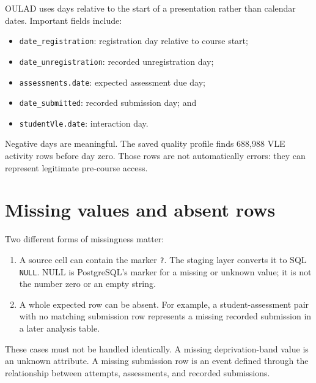 OULAD uses days relative to the start of a presentation rather than calendar
dates. Important fields include:
\begin{itemize}
  \item \texttt{date\_registration}: registration day relative to course start;
  \item \texttt{date\_unregistration}: recorded unregistration day;
  \item \texttt{assessments.date}: expected assessment due day;
  \item \texttt{date\_submitted}: recorded submission day; and
  \item \texttt{studentVle.date}: interaction day.
\end{itemize}

Negative days are meaningful. The saved quality profile finds 688,988 VLE
activity rows before day zero. Those rows are not automatically errors: they
can represent legitimate pre-course access.

\section{Missing values and absent rows}

Two different forms of missingness matter:

\begin{enumerate}
  \item A source cell can contain the marker \texttt{?}. The staging layer
    converts it to SQL \texttt{NULL}. NULL is PostgreSQL's marker for a missing
    or unknown value; it is not the number zero or an empty string.
  \item A whole expected row can be absent. For example, a student-assessment
    pair with no matching submission row represents a missing recorded
    submission in a later analysis table.
\end{enumerate}

These cases must not be handled identically. A missing deprivation-band value
is an unknown attribute. A missing submission row is an event defined through
the relationship between attempts, assessments, and recorded submissions.


